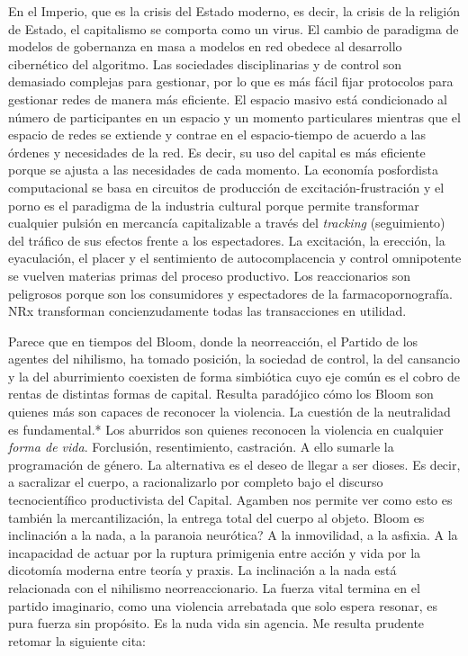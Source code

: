 En el Imperio, que es la crisis del Estado moderno, es decir, la crisis de la religión de Estado, el capitalismo se comporta como un virus. El cambio de paradigma de modelos de gobernanza en masa a modelos en red obedece al desarrollo cibernético del algoritmo. Las sociedades disciplinarias y de control son demasiado complejas para gestionar, por lo que es más fácil fijar protocolos para gestionar redes de manera más eficiente. El espacio masivo está condicionado al número de participantes en un espacio y un momento particulares mientras que el espacio de redes se extiende y contrae en el espacio-tiempo de acuerdo a las órdenes y necesidades de la red. Es decir, su uso del capital es más eficiente porque se ajusta a las necesidades de cada momento. La economía posfordista computacional se basa en circuitos de producción de excitación-frustración y el porno es el paradigma de la industria cultural porque permite transformar cualquier pulsión en mercancía capitalizable a través del \emph{tracking} (seguimiento) del tráfico de sus efectos frente a los espectadores. La excitación, la erección, la eyaculación, el placer y el sentimiento de autocomplacencia y control omnipotente se vuelven materias primas del proceso productivo. Los reaccionarios son peligrosos porque son los consumidores y espectadores de la farmacopornografía. NRx transforman concienzudamente todas las transacciones en utilidad.

Parece que en tiempos del Bloom, donde la neorreacción, el Partido de los agentes del nihilismo, ha tomado posición, la sociedad de control, la del cansancio y la del aburrimiento \autocite{orozcogaribaySociedadCansancioSociedad2015} coexisten de forma simbiótica cuyo eje común es el cobro de rentas de distintas formas de capital. Resulta paradójico cómo los Bloom son quienes más son capaces de reconocer la violencia. La cuestión de la neutralidad es fundamental.* Los aburridos son quienes reconocen la violencia en cualquier \emph{forma de vida}. Forclusión, resentimiento, castración. A ello sumarle la programación de género. La alternativa es el deseo de llegar a ser dioses. Es decir, a sacralizar el cuerpo, a racionalizarlo por completo bajo el discurso tecnocientífico productivista del Capital. Agamben nos permite ver como esto es también la mercantilización, la entrega total del cuerpo al objeto. Bloom es inclinación a la nada, a la paranoia neurótica? A la inmovilidad, a la asfixia. A la incapacidad de actuar por la ruptura primigenia entre acción y vida por la dicotomía moderna entre teoría y praxis. La inclinación a la nada está relacionada con el nihilismo neorreaccionario. La fuerza vital termina en el partido imaginario, como una violencia arrebatada que solo espera resonar, es pura fuerza sin propósito. Es la nuda vida sin agencia. Me resulta prudente retomar la siguiente cita:


